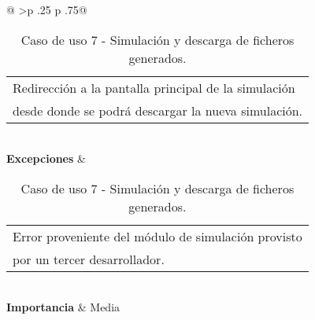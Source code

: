 \begin{table}[h]
\begin{tabular}{@{}
			>{}p {.25\textwidth} p {.75\textwidth}@{}}
\begin{tabular}[c]{@{}l@{}}
			Redirección a la pantalla principal de la simulación\\
			desde donde se podrá descargar la nueva simulación.
		\end{tabular} \\ \midrule
		\textbf{Excepciones}     &  \begin{tabular}[c]{@{}l@{}}
			Error proveniente del módulo de simulación provisto \\
			por un tercer desarrollador.\\ 
		\end{tabular} \\ \midrule
		\textbf{Importancia}     &  Media \\ \bottomrule
	\end{tabular}
	\caption{Caso de uso 7 - Simulación y descarga de ficheros generados.}
\end{table}